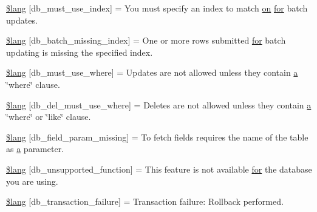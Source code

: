 \begin{DoxyCompactItemize}
\hyperlink{system_2language_2english_2db__lang_8php_a708419b6b94728c30474ee5fdde3b99b}{\$lang} \mbox{[}\textquotesingle{}db\+\_\+must\+\_\+use\+\_\+index\textquotesingle{}\mbox{]} = \textquotesingle{}You must specify an index to match \hyperlink{how_to_play_8js_af1f111425a03a603c02a2abf44ad8c43}{on} \hyperlink{confirm__transfer_8php_aaf007b9fa5c90d7c5a7011bece9cfc15}{for} batch updates.\textquotesingle{}
\item 
\hyperlink{system_2language_2english_2db__lang_8php_af946769a3dd5679c60e6f2ef5f7a5aa1}{\$lang} \mbox{[}\textquotesingle{}db\+\_\+batch\+\_\+missing\+\_\+index\textquotesingle{}\mbox{]} = \textquotesingle{}One or more rows submitted \hyperlink{confirm__transfer_8php_aaf007b9fa5c90d7c5a7011bece9cfc15}{for} batch updating is missing the specified index.\textquotesingle{}
\item 
\hyperlink{system_2language_2english_2db__lang_8php_add4bfc65af76fda2c48fa6a2e8d2e506}{\$lang} \mbox{[}\textquotesingle{}db\+\_\+must\+\_\+use\+\_\+where\textquotesingle{}\mbox{]} = \textquotesingle{}Updates are not allowed unless they contain \hyperlink{_admin_2assets_2js_2bootstrap_8min_8js_a1f5870dcf487187f13d5fd328ed9e6e7}{a} \char`\"{}where\char`\"{} clause.\textquotesingle{}
\item 
\hyperlink{system_2language_2english_2db__lang_8php_a256ae2de791e589ddc23012f74f390ea}{\$lang} \mbox{[}\textquotesingle{}db\+\_\+del\+\_\+must\+\_\+use\+\_\+where\textquotesingle{}\mbox{]} = \textquotesingle{}Deletes are not allowed unless they contain \hyperlink{_admin_2assets_2js_2bootstrap_8min_8js_a1f5870dcf487187f13d5fd328ed9e6e7}{a} \char`\"{}where\char`\"{} or \char`\"{}like\char`\"{} clause.\textquotesingle{}
\item 
\hyperlink{system_2language_2english_2db__lang_8php_a9101352a8cd8c8f34a6b8b1e30c45d8a}{\$lang} \mbox{[}\textquotesingle{}db\+\_\+field\+\_\+param\+\_\+missing\textquotesingle{}\mbox{]} = \textquotesingle{}To fetch fields requires the name of the table as \hyperlink{_admin_2assets_2js_2bootstrap_8min_8js_a1f5870dcf487187f13d5fd328ed9e6e7}{a} parameter.\textquotesingle{}
\item 
\hyperlink{system_2language_2english_2db__lang_8php_a77c256be8532e23e8463481f51732116}{\$lang} \mbox{[}\textquotesingle{}db\+\_\+unsupported\+\_\+function\textquotesingle{}\mbox{]} = \textquotesingle{}This feature is not available \hyperlink{confirm__transfer_8php_aaf007b9fa5c90d7c5a7011bece9cfc15}{for} the database you are using.\textquotesingle{}
\item 
\hyperlink{system_2language_2english_2db__lang_8php_a35f225a7ead01f13f8c6423b7c7433a0}{\$lang} \mbox{[}\textquotesingle{}db\+\_\+transaction\+\_\+failure\textquotesingle{}\mbox{]} = \textquotesingle{}Transaction failure\+: Rollback performed.\textquotesingle{}

\end{DoxyCompactItemize}
